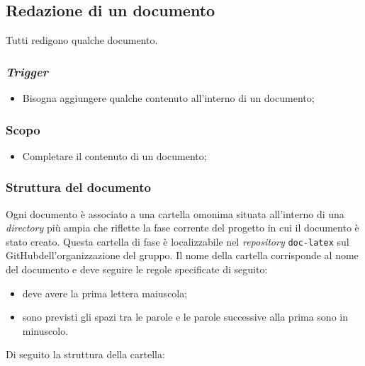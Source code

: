 \subsection{Redazione di un documento}
\label{redazione-documento}

Tutti redigono qualche documento.

\subsubsection{\textit{Trigger}}
\begin{itemize}
	\item Bisogna aggiungere qualche contenuto all'interno di un documento;
\end{itemize}

\subsubsection{Scopo}
\begin{itemize}
	\item Completare il contenuto di un documento;
\end{itemize}

\subsubsection{Struttura del documento}
Ogni documento è associato a una cartella omonima situata all'interno di una
\textit{directory} più ampia che riflette la fase corrente del progetto in cui
il documento è stato creato.
Questa cartella di fase è localizzabile nel \textit{repository\g}
\texttt{doc-latex} sul GitHub\g dell'organizzazione del gruppo.
Il nome della cartella corrisponde al nome del documento e deve seguire le
regole specificate di seguito:
\begin{itemize}
	\item deve avere la prima lettera maiuscola;
	\item sono previsti gli spazi tra le parole e le parole successive alla
	      prima sono in minuscolo.
\end{itemize}

Di seguito la struttura della cartella:

\vspace{0.5cm}


